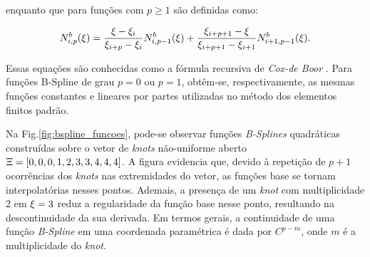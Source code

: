 \documentclass[tese_patricia]{subfiles}
\begin{document}
\noindent enquanto que para funções com $p\geq1$ são definidas como:

\begin{align}
N^b_{i,p}(\xi)=\frac{\xi-\xi_{i}}{\xi_{i+p}-\xi_{i}}N^b_{i,p-1}(\xi) + 
\frac{\xi_{i+p+1}-\xi}{\xi_{i+p+1}-\xi_{i+1}}N^b_{i+1,p-1}(\xi). \label{eq:bsplines_n}
\end{align}


Essas equações são conhecidas como a fórmula recursiva de \textit{Cox-de Boor} \cite{Cox1972,DEBOOR1972}. Para funções B-Spline de grau $p=0$ ou $p=1$, obtêm-se, respectivamente, as mesmas funções constantes e lineares por partes utilizadas no método dos elementos finitos padrão.

Na Fig.\ref{fig:bspline_funcoes}, pode-se observar funções \textit{B-Splines} quadráticas construídas sobre o vetor de \textit{knots} não-uniforme aberto $\Xi=\left[0,0,0,1,2,3,3,4,4,4\right]$. A figura evidencia que, devido à repetição de $p+1$ ocorrências dos \textit{knots} nas extremidades do vetor, as funções base se tornam interpolatórias nesses pontos. Ademais, a presença de um \textit{knot} com multiplicidade 2 em $\xi=3$ reduz a regularidade da função base nesse ponto, resultando na descontinuidade da sua derivada. Em termos gerais, a continuidade de uma função \textit{B-Spline} em uma coordenada paramétrica é dada por $C^{p-m}$, onde $m$ é a multiplicidade do \textit{knot}.
\end{document}
